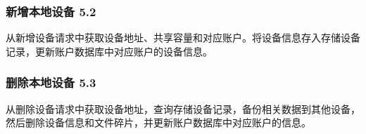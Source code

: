 \subsubsection{新增本地设备 5.2}
从新增设备请求中获取设备地址、共享容量和对应账户。将设备信息存入存储设备记录，更新账户数据库中对应账户的设备信息。

\subsubsection{删除本地设备 5.3}
从删除设备请求中获取设备地址，查询存储设备记录，备份相关数据到其他设备，然后删除设备信息和文件碎片，并更新账户数据库中对应账户的信息。


